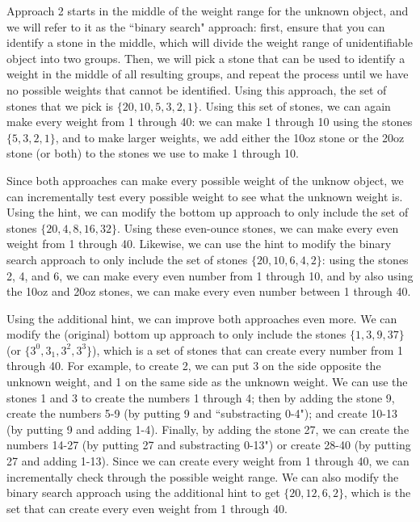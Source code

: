 \documentclass[twoside,12pt]{article}
\begin{document}
\begin{problem}{16}
{Approach 2 starts in the middle of the weight range for the unknown object, and we will refer to it as the ``binary search" approach: first, 
ensure that you can identify a stone in the middle, which will divide the weight range of unidentifiable object into two groups.  Then, we will pick a stone that can be used to identify a weight in the middle of all resulting groups, and repeat the process until we have no possible weights that cannot be identified.  Using this approach, the set of stones that we pick is $\{  20, 10, 5, 3, 2, 1 \}$.  Using this set of stones, we can again make every weight from 1 through 40: we can make 1 through 10 using the stones $\{  5, 3, 2, 1 \}$, and to 
make larger weights, we add either the 10oz stone or the 20oz stone (or both) to the stones we use to make 1 through 10.

Since both approaches can make every possible weight of the unknow object, we can incrementally test every possible weight to see what 
the unknown weight is.  Using the hint, we can modify the bottom up approach to only include the set of stones 
$\{  20, 4, 8, 16, 32 \}$.  Using these even-ounce stones, we can make every even weight from 1 through 40.  Likewise, we can use the hint to modify the binary search approach to only include the set of stones $\{  20, 10, 6, 4, 2 \}$: using the stones 2, 4, and 
6, we can make every even number from 1 through 10, and by also using the 10oz and 20oz stones, we can make every even number 
between 1 through 40.  

Using the additional hint, we can improve both approaches even more.  We can modify the (original) bottom up approach 
to only include the stones $ \{ 1, 3, 9, 37 \}$ (or $\{3^{0}, 3_{1}, 3^{2}, 3^{3} \}$), which is a set of stones that can create every 
number from 1 through 40.  For example, to create 2, we can put 3 on the side opposite the unknown weight, and 1 on the same side as 
the unknown weight.  We can use the stones 1 and 3 to create the numbers 1 through 4; then by adding the stone 9, create the numbers 5-9 (by putting 9 and ``substracting 0-4"); and create 10-13 (by putting 9 and adding 1-4).  Finally, by adding the stone 27, we can 
create the numbers 14-27 (by putting 27 and substracting 0-13") or create 28-40 (by putting 27 and adding 1-13).  
Since we can create every weight from 1 through 40, we can incrementally check through the possible weight range.  We can also modify the binary search approach using the additional hint to get $\{20, 12, 6, 2 \}$, which is the set that can create 
every even weight from 1 through 40.
}

\end{problem}
\end{document}
